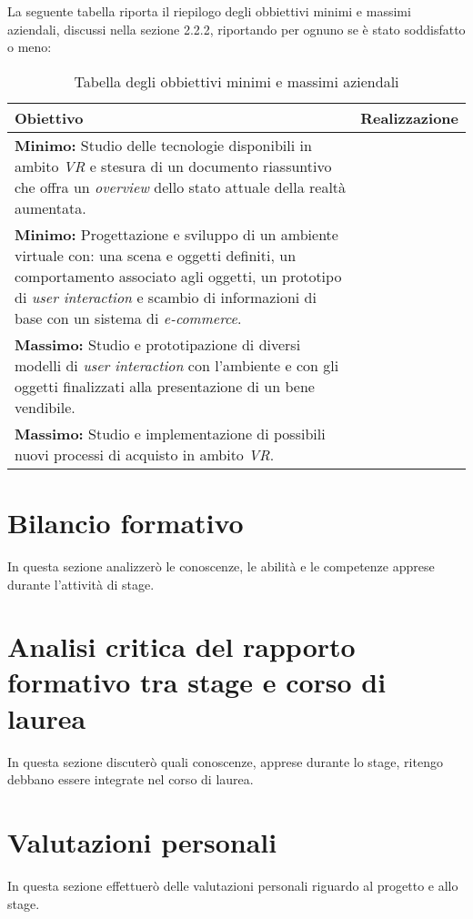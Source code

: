 La seguente tabella riporta il riepilogo degli obbiettivi minimi e massimi aziendali, discussi nella sezione 2.2.2, riportando per ognuno se è stato soddisfatto o meno:

\begin{table}
	\centering
	\label{tabella-obbiettivi}
	\begin{tabular}{| p{6cm} | p{6cm} |}
		\hline
		\textbf{Obiettivo} & \textbf{Realizzazione} \\ \hline
		 \textbf{Minimo:} Studio delle tecnologie disponibili in ambito \textit{VR}\ped{\hyperlink{vr}{G}} e stesura di un documento riassuntivo che offra un \textit{overview} dello stato attuale della realtà aumentata. &  \\ \hline
		 \textbf{Minimo:} Progettazione e sviluppo di un ambiente virtuale con: una scena e oggetti definiti, un comportamento associato agli oggetti, un prototipo di \textit{user interaction} e scambio di informazioni di base con un sistema di \textit{e-commerce}. & \\ \hline
		 \textbf{Massimo:} Studio e prototipazione di diversi modelli di \textit{user interaction} con l'ambiente e con gli oggetti finalizzati alla presentazione di un bene vendibile. & \\ \hline
		 \textbf{Massimo:} Studio e implementazione di possibili nuovi processi di acquisto in ambito \textit{VR}\ped{\hyperlink{vr}{G}}. & \\ \hline
	\end{tabular}
	\caption{Tabella degli obbiettivi minimi e massimi aziendali}
\end{table}
\FloatBarrier


\section{Bilancio formativo}

In questa sezione analizzerò le conoscenze, le abilità e le competenze apprese durante l'attività di stage.

\section{Analisi critica del rapporto formativo tra stage e corso di laurea}

In questa sezione discuterò quali conoscenze, apprese durante lo stage, ritengo debbano essere integrate nel corso di laurea.

\section{Valutazioni personali}

In questa sezione effettuerò delle valutazioni personali riguardo al progetto e allo stage.